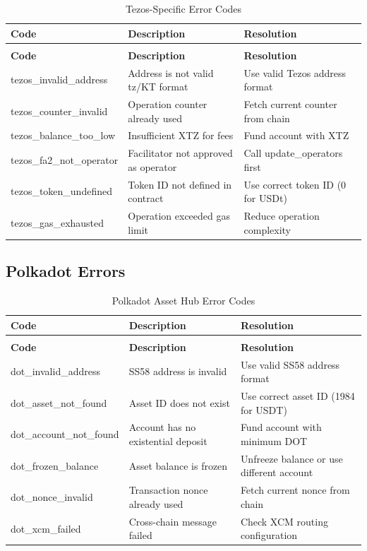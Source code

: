 \begin{longtable}{>{\ttfamily\footnotesize}l p{5cm} p{4cm}}
\caption{Tezos-Specific Error Codes} \label{tab:tezos-errors} \\
\toprule
\normalfont\textbf{Code} & \textbf{Description} & \textbf{Resolution} \\
\midrule
\endfirsthead
\multicolumn{3}{c}{\tablename\ \thetable\ -- continued} \\
\toprule
\normalfont\textbf{Code} & \textbf{Description} & \textbf{Resolution} \\
\midrule
\endhead
\midrule
\endfoot
\bottomrule
\endlastfoot
tezos\_invalid\_address & Address is not valid tz/KT format & Use valid Tezos address format \\
tezos\_counter\_invalid & Operation counter already used & Fetch current counter from chain \\
tezos\_balance\_too\_low & Insufficient XTZ for fees & Fund account with XTZ \\
tezos\_fa2\_not\_operator & Facilitator not approved as operator & Call update\_operators first \\
tezos\_token\_undefined & Token ID not defined in contract & Use correct token ID (0 for USDt) \\
tezos\_gas\_exhausted & Operation exceeded gas limit & Reduce operation complexity \\
\end{longtable}

\subsection{Polkadot Errors}

\begin{longtable}{>{\ttfamily\footnotesize}l p{5cm} p{4cm}}
\caption{Polkadot Asset Hub Error Codes} \label{tab:polkadot-errors} \\
\toprule
\normalfont\textbf{Code} & \textbf{Description} & \textbf{Resolution} \\
\midrule
\endfirsthead
\multicolumn{3}{c}{\tablename\ \thetable\ -- continued} \\
\toprule
\normalfont\textbf{Code} & \textbf{Description} & \textbf{Resolution} \\
\midrule
\endhead
\midrule
\endfoot
\bottomrule
\endlastfoot
dot\_invalid\_address & SS58 address is invalid & Use valid SS58 address format \\
dot\_asset\_not\_found & Asset ID does not exist & Use correct asset ID (1984 for USDT) \\
dot\_account\_not\_found & Account has no existential deposit & Fund account with minimum DOT \\
dot\_frozen\_balance & Asset balance is frozen & Unfreeze balance or use different account \\
dot\_nonce\_invalid & Transaction nonce already used & Fetch current nonce from chain \\
dot\_xcm\_failed & Cross-chain message failed & Check XCM routing configuration \\
\end{longtable}

